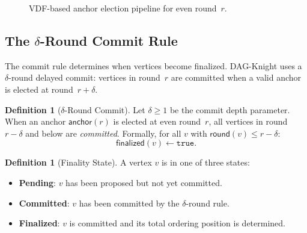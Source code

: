 \documentclass[11pt,a4paper]{article}
\theoremstyle{definition}
\newtheorem{definition}[theorem]{Definition}
\theoremstyle{remark}
\newcommand{\DK}{\textsf{DAG-Knight}}
\newcommand{\round}{\mathsf{round}}
\newcommand{\anchor}{\mathsf{anchor}}
\newcommand{\finalized}{\mathsf{finalized}}
\begin{document}
\begin{figure}[t]
\centering
{}
\caption{VDF-based anchor election pipeline for even round~$r$.}
\label{fig:anchor-election}
\end{figure}

\subsection{The $\delta$-Round Commit Rule}\label{sec:commit-rule}

The commit rule determines when vertices become finalized.
\DK{} uses a $\delta$-round delayed commit: vertices in round~$r$ are
committed when a valid anchor is elected at round~$r + \delta$.

\begin{definition}[$\delta$-Round Commit]\label{def:delta-commit}
Let $\delta \geq 1$ be the commit depth parameter.
When an anchor $\anchor(r)$ is elected at even round~$r$, all vertices
in round $r - \delta$ and below are \emph{committed}.
Formally, for all $v$ with $\round(v) \leq r - \delta$:
\[
  \finalized(v) \leftarrow \texttt{true}.
\]
\end{definition}

\begin{definition}[Finality State]\label{def:finality-state}
A vertex $v$ is in one of three states:
\begin{itemize}[nosep]
  \item \textbf{Pending}: $v$ has been proposed but not yet committed.
  \item \textbf{Committed}: $v$ has been committed by the $\delta$-round rule.
  \item \textbf{Finalized}: $v$ is committed and its total ordering position
    is determined.
\end{itemize}
\end{definition}
\end{document}

